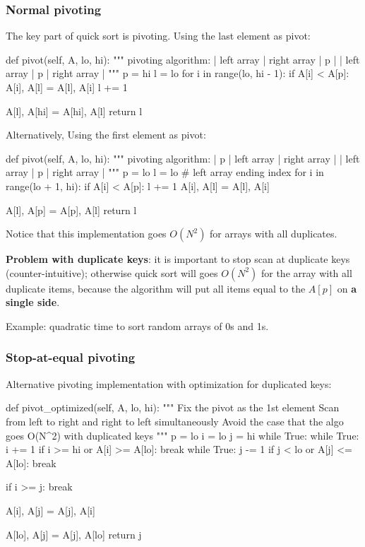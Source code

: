 \subsubsection{Normal pivoting}\label{section:pivot}
The key part of quick sort is pivoting. Using the last element as pivot:
\begin{python}
def pivot(self, A, lo, hi):
    """
    pivoting algorithm:
    | left array | right array | p |
    | left array | p | right array |
    """
    p = hi
    l = lo
    for i in range(lo, hi - 1):
        if A[i] < A[p]:
            A[i], A[l] = A[l], A[i]
            l += 1
            
    A[l], A[hi] = A[hi], A[l]
    return l
\end{python}

Alternatively, Using the first element as pivot:
\begin{python}
def pivot(self, A, lo, hi):
    """
    pivoting algorithm:
    | p | left array | right array |
    | left array | p | right array |
    """
    p = lo
    l = lo  # left array ending index
    for i in range(lo + 1, hi):
        if A[i] < A[p]:
            l += 1
            A[i], A[l] = A[l], A[i]

    A[l], A[p] = A[p], A[l]
    return l
\end{python}

Notice that this implementation goes $O(N^2)$ for arrays with all duplicates.

\textbf{Problem with duplicate keys}: it is important to stop scan at duplicate
keys (counter-intuitive); otherwise quick sort will goes $O(N^2)$ for the
array with all duplicate items, because the algorithm will put all items
equal to the $A[p]$ on \textbf{a single side}. 

Example: quadratic time to sort random arrays of 0s and 1s.

\subsubsection{Stop-at-equal pivoting}
Alternative pivoting implementation with optimization for duplicated keys:
\begin{python}
def pivot_optimized(self, A, lo, hi):
    """
    Fix the pivot as the 1st element
    Scan from left to right and right to left simultaneously
    Avoid the case that the algo goes O(N^2) with duplicated keys
    """
    p = lo
    i = lo
    j = hi
    while True:
        while True:
            i += 1
            if i >= hi or A[i] >= A[lo]:
                break
        while True:
            j -= 1
            if j < lo or A[j] <= A[lo]:
                break

        if i >= j:
            break

        A[i], A[j] = A[j], A[i]

    A[lo], A[j] = A[j], A[lo]
    return j

\end{python}
